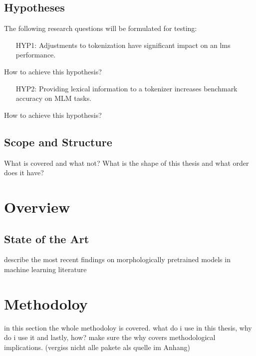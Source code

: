\documentclass[english]{ttlab-qualify}
\begin{document}
    \section{Hypotheses}
    \label{sec:hypothesis}

    The following research questions will be formulated for testing:
    \begin{framed}
        \begin{itemize}[itemindent=1em]
            \item[HYP1:] Adjustments to tokenization have significant impact on an \ac{lm}s performance.
        \end{itemize}
    \end{framed}
    How to achieve this hypothesis?
    \begin{framed}
        \begin{itemize}[itemindent=1em]
        \item[HYP2:] Providing lexical information to a tokenizer increases benchmark accuracy on MLM tasks.
    \end{itemize}
    \end{framed}
    How to achieve this hypothesis?

    \section{Scope and Structure}
    \label{sec:scope-and-structure}
    What is covered and what not?
    What is the shape of this thesis and what order does it have?

    \chapter{Overview}
    \label{ch:overview}


    \section{State of the Art}
    \label{sec:state-of-the-art}
    describe the most recent findings on morphologically pretrained models in machine learning literature

    \chapter{Methodoloy}
    \label{ch:methodology}
    in this section the whole methodoloy is covered. what do i use in this thesis, why do i use it and lastly, how?
    make sure the why covers methodological implications. (vergiss nicht alle pakete als quelle im Anhang)
\end{document}

